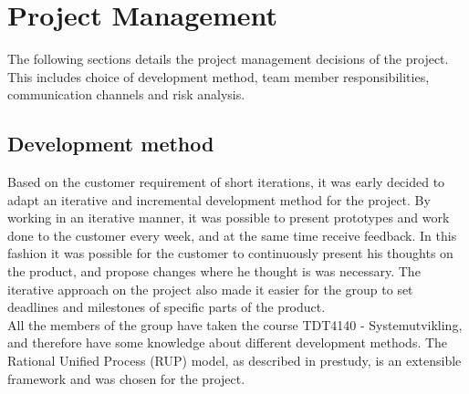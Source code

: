 \chapter{Project Management}
The following sections details the project management decisions of the project. This includes choice of development method, team member responsibilities, communication channels and risk analysis.

\section{Development method}
\label{development-method}
Based on the customer requirement of short iterations, it was early decided to adapt an iterative and incremental development method for the project. By working in an iterative manner, it was possible to present prototypes and work done to the customer every week, and at the same time receive feedback. In this fashion it was possible for the customer to continuously present his thoughts on the product, and propose changes where he thought is was necessary. The iterative approach on the project also made it easier for the group to set deadlines and milestones of specific parts of the product.\\
\newline
All the members of the group have taken the course TDT4140 - Systemutvikling, and therefore have some knowledge about different development methods. The Rational Unified Process (RUP) model, as described in prestudy, is an extensible framework\cite{kruchten} and was chosen for the project.


